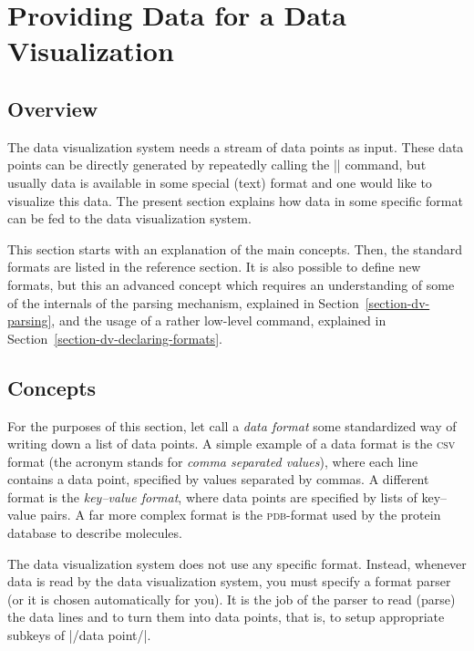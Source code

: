 %
%
%


\section{Providing Data for a Data Visualization}
\label{section-dv-formats}

\subsection{Overview}

The data visualization system needs a stream of data points as input. These
data points can be directly generated by repeatedly calling the |\pgfdatapoint|
command, but usually data is available in some special (text) format and one
would like to visualize this data. The present section explains how data in
some specific format can be fed to the data visualization system.

This section starts with an explanation of the main concepts. Then, the
standard formats are listed in the reference section. It is also possible to
define new formats, but this an advanced concept which requires an
understanding of some of the internals of the parsing mechanism, explained in
Section~\ref{section-dv-parsing}, and the usage of a rather low-level command,
explained in Section~\ref{section-dv-declaring-formats}.


\subsection{Concepts}

For the purposes of this section, let call a \emph{data format} some
standardized way of writing down a list of data points. A simple example of a
data format is the \textsc{csv} format (the acronym stands for \emph{comma
separated values}), where each line contains a data point, specified by values
separated by commas. A different format is the \emph{key--value format}, where
data points are specified by lists of key--value pairs. A far more complex
format is the \textsc{pdb}-format used by the protein database to describe
molecules.

The data visualization system does not use any specific format. Instead,
whenever data is read by the data visualization system, you must specify a
format parser (or it is chosen automatically for you). It is the job of the
parser to read (parse) the data lines and to turn them into data points, that
is, to setup appropriate subkeys of |/data point/|.

